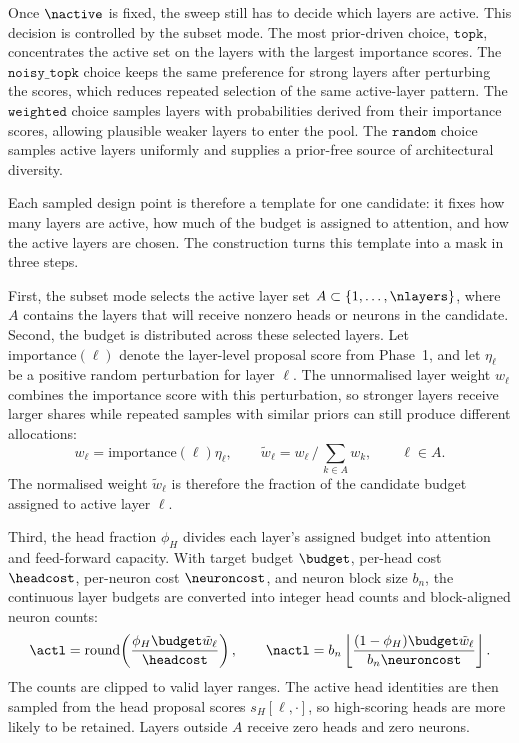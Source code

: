 Once $\nactive$ is fixed, the sweep still has to decide which layers are active. This decision is controlled by the subset mode. The most prior-driven choice, $\mathtt{topk}$, concentrates the active set on the layers with the largest importance scores. The $\mathtt{noisy\_topk}$ choice keeps the same preference for strong layers after perturbing the scores, which reduces repeated selection of the same active-layer pattern. The $\mathtt{weighted}$ choice samples layers with probabilities derived from their importance scores, allowing plausible weaker layers to enter the pool. The $\mathtt{random}$ choice samples active layers uniformly and supplies a prior-free source of architectural diversity.

Each sampled design point is therefore a template for one candidate: it fixes how many layers are active, how much of the budget is assigned to attention, and how the active layers are chosen. The construction turns this template into a mask in three steps.

First, the subset mode selects the active layer set $A \subset \{1,\ldots,\nlayers\}$, where $A$ contains the layers that will receive nonzero heads or neurons in the candidate. Second, the budget is distributed across these selected layers. Let $\mathrm{importance}(\ell)$ denote the layer-level proposal score from Phase~1, and let $\eta_\ell$ be a positive random perturbation for layer $\ell$. The unnormalised layer weight $w_\ell$ combines the importance score with this perturbation, so stronger layers receive larger shares while repeated samples with similar priors can still produce different allocations:
\[
w_\ell = \mathrm{importance}(\ell)\eta_\ell,
\qquad
\tilde w_\ell = w_\ell \,\big/\, \textstyle \sum_{k \in A} w_k,
\qquad
\ell \in A .
\]
The normalised weight $\tilde w_\ell$ is therefore the fraction of the candidate budget assigned to active layer $\ell$.

Third, the head fraction $\phi_H$ divides each layer's assigned budget into attention and feed-forward capacity. With target budget $\budget$, per-head cost $\headcost$, per-neuron cost $\neuroncost$, and neuron block size $b_n$, the continuous layer budgets are converted into integer head counts and block-aligned neuron counts:
\[
\actl =
\mathrm{round}\!\left(
\frac{\phi_H \budget \tilde w_\ell}{\headcost}
\right),
\qquad
\nactl =
b_n
\left\lfloor
\frac{(1-\phi_H)\budget \tilde w_\ell}{b_n\neuroncost}
\right\rfloor .
\]
The counts are clipped to valid layer ranges. The active head identities are then sampled from the head proposal scores $s_H[\ell,\cdot]$, so high-scoring heads are more likely to be retained. Layers outside $A$ receive zero heads and zero neurons.

